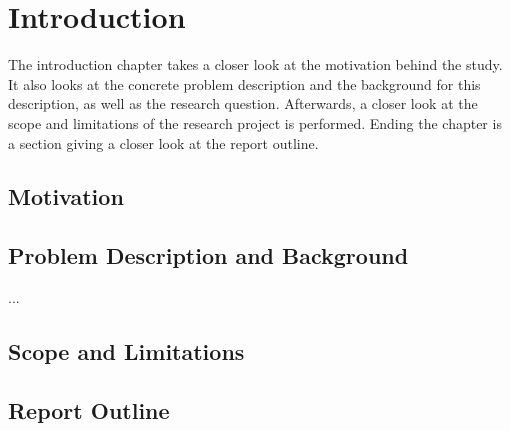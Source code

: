 \chapter{Introduction}


\minitoc

The introduction chapter takes a closer look at the motivation behind the study. It also looks at the concrete problem description and the background for this description, as well as the research question. Afterwards, a closer look at the scope and limitations of the research project is performed. Ending the chapter is a section giving a closer look at the report outline.

\newpage

\section{Motivation}


\section{Problem Description and Background}
\label{pdab}

\begin{fancyquotes}
...
\end{fancyquotes}

\section{Scope and Limitations}

\section{Report Outline}

